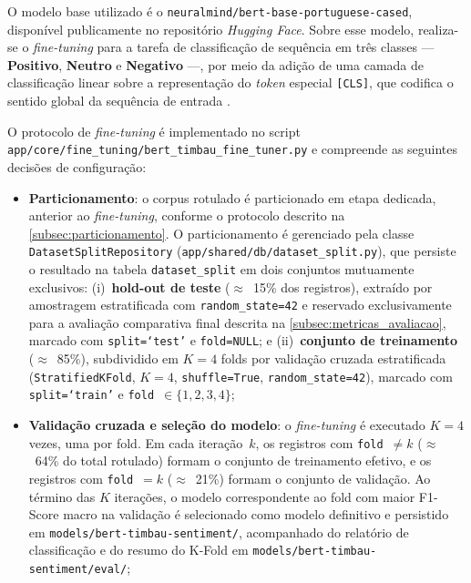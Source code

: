 O modelo base utilizado é o \texttt{neuralmind/bert-base-portuguese-cased}, disponível publicamente no repositório \textit{Hugging Face}. Sobre esse modelo, realiza-se o \textit{fine-tuning} para a tarefa de classificação de sequência em três classes --- \textbf{Positivo}, \textbf{Neutro} e \textbf{Negativo} ---, por meio da adição de uma camada de classificação linear sobre a representação do \textit{token} especial \texttt{[CLS]}, que codifica o sentido global da sequência de entrada \cite{devlin2019}.

O protocolo de \textit{fine-tuning} é implementado no script \texttt{app/core/fine\_tuning/bert\_timbau\_fine\_tuner.py} e compreende as seguintes decisões de configuração:

\begin{itemize}

	\item \textbf{Particionamento}: o corpus rotulado é particionado em etapa dedicada, anterior ao \textit{fine-tuning}, conforme o protocolo descrito na \autoref{subsec:particionamento}. O particionamento é gerenciado pela classe \texttt{DatasetSplitRepository} (\texttt{app/shared/db/dataset\_split.py}), que persiste o resultado na tabela \texttt{dataset\_split} em dois conjuntos mutuamente exclusivos: (i)~\textbf{hold-out de teste} ($\approx$~15\% dos registros), extraído por amostragem estratificada com \texttt{random\_state=42} e reservado exclusivamente para a avaliação comparativa final descrita na \autoref{subsec:metricas_avaliacao}, marcado com \texttt{split=`test'} e \texttt{fold=NULL}; e (ii)~\textbf{conjunto de treinamento} ($\approx$~85\%), subdividido em $K=4$ folds por validação cruzada estratificada (\texttt{StratifiedKFold}, $K=4$, \texttt{shuffle=True}, \texttt{random\_state=42}), marcado com \texttt{split=`train'} e \texttt{fold}~$\in \{1, 2, 3, 4\}$;
	
	\item \textbf{Validação cruzada e seleção do modelo}: o \textit{fine-tuning} é executado $K=4$ vezes, uma por fold. Em cada iteração~$k$, os registros com \texttt{fold}~$\neq k$ ($\approx$~64\% do total rotulado) formam o conjunto de treinamento efetivo, e os registros com \texttt{fold}~$= k$ ($\approx$~21\%) formam o conjunto de validação. Ao término das $K$ iterações, o modelo correspondente ao fold com maior F1-Score macro na validação é selecionado como modelo definitivo e persistido em \texttt{models/bert-timbau-sentiment/}, acompanhado do relatório de classificação e do resumo do K-Fold em \texttt{models/bert-timbau-sentiment/eval/};
	

\end{itemize}
